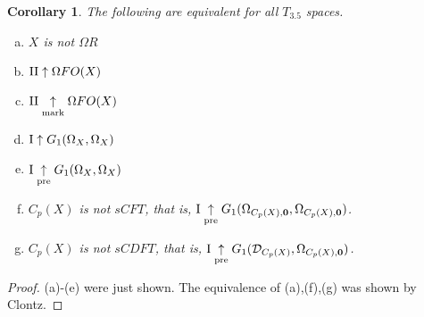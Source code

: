 \documentclass[11pt]{article}
\theoremstyle{plain}
\newtheorem{corollary}[theorem]{Corollary}
\theoremstyle{definition}
\theoremstyle{remark}
\theoremstyle{plain}
\theoremstyle{definition}
\theoremstyle{remark}
\begin{document}
\begin{corollary}
The following are equivalent for all \(T_{3.5}\) spaces.
\begin{enumerate}[a)]
\item \(X\) is not \(\Omega R\)
\item \(\mathrm{II}\uparrow \Omega FO(X)\)
\item \(\mathrm{II}\underset{\text{mark}}{\uparrow} \Omega FO(X)\)
\item \(\mathrm{I}\uparrow G_1(\Omega_X,\Omega_X)\)
\item \(\mathrm{I}\underset{\text{pre}}{\uparrow} G_1(\Omega_X,\Omega_X)\)
\item \(C_p(X)\) is not \(sCFT\), that is, 
  \(\mathrm{I}\underset{\text{pre}}{\uparrow} G_{1}(\Omega_{C_p(X),\mathbf 0},\Omega_{C_p(X),\mathbf 0})\).
\item \(C_p(X)\) is not \(sCDFT\), that is,
  \(\mathrm{I}\underset{\text{pre}}{\uparrow} G_{1}(\mathcal{D}_{C_p(X)},\Omega_{C_p(X),\mathbf 0})\).
\end{enumerate}
\end{corollary}
\begin{proof}
(a)-(e) were just shown.
The equivalence of (a),(f),(g) was shown by Clontz.
\end{proof}
\end{document}
